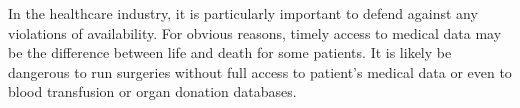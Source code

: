 \documentclass{article}
\begin{document}
In the healthcare industry, it is particularly important to defend against any violations of availability.
For obvious reasons, timely access to medical data may be the difference between life and death for some patients.
It is likely be dangerous to run surgeries without full access to patient's medical data or even to blood transfusion or organ donation databases.

\end{document}

